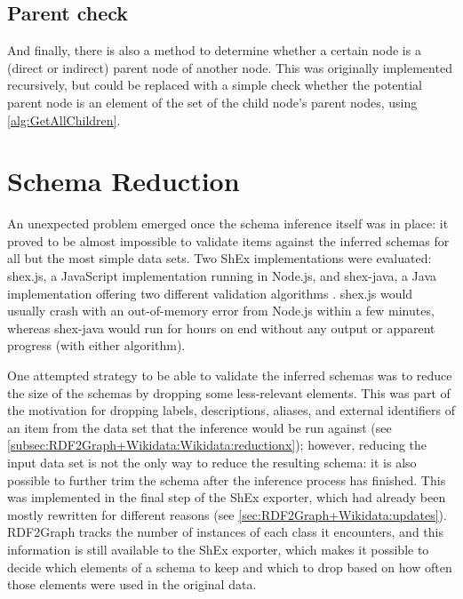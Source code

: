 \subsection{Parent check}
\label{subsec:RDF2Graph+Wikidata:cyclic-graph:IsParent}

And finally, there is also a method to determine whether a certain node is a (direct or indirect) parent node of another node.
This was originally implemented recursively,
but could be replaced with a simple check whether the potential parent node is an element of the set of the child node’s parent nodes,
using \cref{alg:GetAllChildren}.

\section{Schema Reduction}
\label{sec:RDF2Graph+Wikidata:schema-reduction}

An unexpected problem emerged once the schema inference itself was in place: %
it proved to be almost impossible to validate items against the inferred schemas
for all but the most simple data sets.
Two ShEx implementations were evaluated:
shex.js, %
a JavaScript implementation running in Node.js,
and shex-java,
a Java implementation offering two different validation algorithms \cite{boneva:hal-01590350}.
shex.js would usually crash with an out-of-memory error from Node.js within a few minutes,
whereas shex-java would run for hours on end without any output or apparent progress
(with either algorithm).

One attempted strategy to be able to validate the inferred schemas %
was to reduce the size of the schemas by dropping some less-relevant elements.
This was part of the motivation for dropping labels, descriptions, aliases, and external identifiers of an item
from the data set that the inference would be run against
(see \cref{subsec:RDF2Graph+Wikidata:Wikidata:reductionx});
however, reducing the input data set is not the only way to reduce the resulting schema:
it is also possible to further trim the schema after the inference process has finished.
This was implemented in the final step of the ShEx exporter, %
which had already been mostly rewritten for different reasons
(see \cref{sec:RDF2Graph+Wikidata:updates}).
RDF2Graph tracks the number of instances of each class it encounters,
and this information is still available to the ShEx exporter,
which makes it possible to decide which elements of a schema to keep and which to drop
based on how often those elements were used in the original data. %

